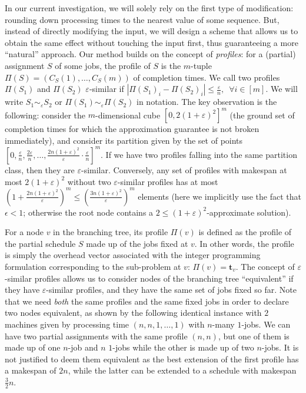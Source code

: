 \documentclass[moor,sglanonrev]{informs4}
\theoremstyle{plain}
\begin{document}
In our current investigation, we will solely rely on the first type of modification: rounding down processing times to the nearest value of some sequence. But, instead of directly modifying the input, we will design a scheme that allows us to obtain the same effect without touching the input first, thus guaranteeing a more ``natural'' approach. Our method builds on the concept of  
\emph{profiles}: for a (partial) assignment $S$ of some jobs, the profile of $S$ is the $m$-tuple $\Pi(S)=(C_S(1), \ldots, C_S(m))$ of completion times. We call two profiles $\Pi(S_1)$ and $\Pi(S_2)$ $\varepsilon$-similar if $|\Pi(S_1)_i - \Pi(S_2)_i| \le \frac{\varepsilon}{n}, \,\,\,\forall i \in [m]$. We will write $S_1 \sim_{\varepsilon} S_2$ or $\Pi(S_1) \sim_{\varepsilon} \Pi(S_2)$ in notation. The key observation is the following: consider the $m$-dimensional cube $\left[0,2(1+\varepsilon)^2\right]^m$ (the ground set of completion times for which the approximation guarantee is not broken immediately), and consider its partition given by the set of points $\left[0,\frac{\varepsilon}{n}, \frac{2\varepsilon}{n}, \ldots, \frac{2n(1+\varepsilon)^2}{\varepsilon}\cdot \frac{\varepsilon}{n}\right]^m$. If we have two profiles falling into the same partition class, then they are $\varepsilon$-similar. Conversely, any set of profiles with makespan at most $2(1+\varepsilon)^2$ without two $\varepsilon$-similar profiles has at most $\left(1+\frac{2n(1+\varepsilon)^2}{\varepsilon}\right)^m \le \left(\frac{3n(1+\varepsilon)^2}{\varepsilon}\right)^m$ elements (here we implicitly use the fact that $\epsilon < 1$; otherwise the root node contains a $2\le(1+\varepsilon)^2$-approximate solution).

For a node $v$ in the branching tree, its profile $\Pi(v)$ is defined as the profile of the partial schedule $S$ made up of the jobs fixed at $v$. In other words, the profile is simply the overhead vector associated with the integer programming formulation corresponding to the sub-problem at $v$: $\Pi(v) = \bm{t}_v$. The concept of $\varepsilon$-similar profiles allows us to consider nodes of the branching tree ``equivalent'' if they have $\varepsilon$-similar profiles, and they have the same set of jobs fixed so far. Note that we need \emph{both} the same profiles and the same fixed jobs in order to declare two nodes equivalent, as shown by the following identical instance with $2$ machines given by processing time $(n,n,1,\ldots, 1)$ with $n$-many $1$-jobs. We can have two partial assignments with the same profile $(n,n)$, but one of them is made up of one $n$-job and $n$ $1$-jobs while the other is made up of two $n$-jobs. It is not justified to deem them equivalent as the best extension of the first profile has a makespan of $2n$, while the latter can be extended to a schedule with makespan $\frac{3}{2}n$.
\end{document}
